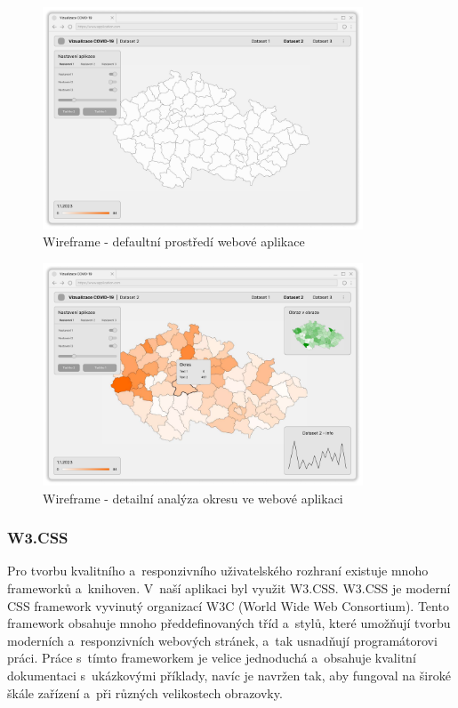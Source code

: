 \begin{figure}[H]
	\centering
	\includegraphics[width=0.85\textwidth]{Pictures/wireframe_default_white.pdf}
	\caption{Wireframe - defaultní prostředí webové aplikace}
	\label{fig:WireframeDefault}
\end{figure}

\begin{figure}[H]
	\centering
	\includegraphics[width=0.85\textwidth]{Pictures/wireframe_full.pdf}
	\caption{Wireframe - detailní analýza okresu ve webové aplikaci}
	\label{fig:WireframeFull}
\end{figure}

\subsubsection*{W3.CSS}

Pro tvorbu kvalitního a~responzivního uživatelského rozhraní existuje mnoho frameworků a~knihoven. V~naší aplikaci byl využit W3.CSS. W3.CSS je moderní CSS framework vyvinutý organizací W3C (World Wide Web Consortium). Tento framework obsahuje mnoho předdefinovaných tříd a~stylů, které umožňují tvorbu moderních a~responzivních webových stránek, a~tak usnadňují programátorovi práci. Práce s~tímto frameworkem je velice jednoduchá a~obsahuje kvalitní dokumentaci s~ukázkovými příklady, navíc je navržen tak, aby fungoval na široké škále zařízení a~při různých velikostech obrazovky.

